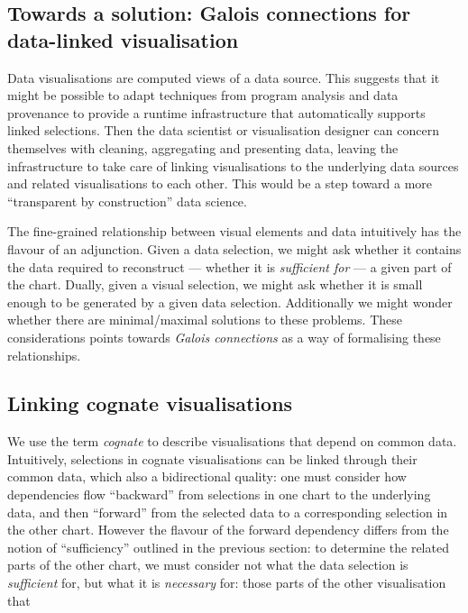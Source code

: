 

\subsection{Towards a solution: Galois connections for data-linked visualisation}

Data visualisations are computed views of a data source. This suggests that it might be possible to adapt techniques from program analysis and data provenance to provide a runtime infrastructure that automatically supports linked selections. Then the data scientist or visualisation designer can concern themselves with cleaning, aggregating and presenting data, leaving the infrastructure to take care of linking visualisations to the underlying data sources and related visualisations to each other. This would be a step toward a more ``transparent by construction'' data science.

The fine-grained relationship between visual elements and data intuitively has the flavour of an adjunction. Given a data selection, we might ask whether it contains the data required to reconstruct --- whether it is \emph{sufficient for} --- a given part of the chart. Dually, given a visual selection, we might ask whether it is small enough to be generated by a given data selection. Additionally we might wonder whether there are minimal/maximal solutions to these problems. These considerations points towards \emph{Galois connections} as a way of formalising these relationships.

\subsection{Linking cognate visualisations}

We use the term \emph{cognate} to describe visualisations that depend on common data. Intuitively, selections in cognate visualisations can be linked through their common data, which also a bidirectional quality: one must consider how dependencies flow ``backward'' from selections in one chart to the underlying data, and then ``forward'' from the selected data to a corresponding selection in the other chart. However the flavour of the forward dependency differs from the notion of ``sufficiency'' outlined in the previous section: to determine the related parts of the other chart, we must consider not what the data selection is \emph{sufficient} for, but what it is \emph{necessary} for: those parts of the other visualisation that



